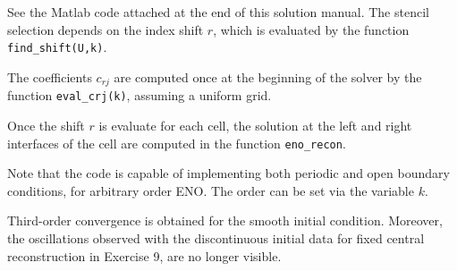 \documentclass{article}
\begin{document}





\begin{exerciseList}


\item
See the Matlab code attached at the end of this solution manual. The stencil selection depends on the index shift $r$, which is evaluated by the function {\tt find\_shift(U,k)}.

\item
The coefficients $c_{rj}$ are computed once at the beginning of the solver by the function {\tt eval\_crj(k)}, assuming a uniform grid. 

\item Once the shift $r$ is evaluate for each cell, the solution at the left and right interfaces of the cell are computed in the function {\tt eno\_recon}.

\item Note that the code is capable of implementing both periodic and open boundary conditions, for arbitrary order ENO. The order can be set via the variable $k$.

\item
Third-order convergence is obtained for the smooth initial condition. Moreover, the oscillations observed with the discontinuous initial data for fixed central reconstruction in Exercise 9, are no longer visible.


\end{exerciseList}











\end{document}
